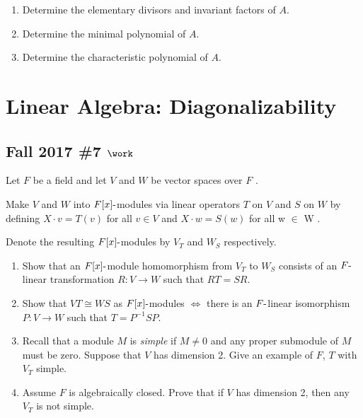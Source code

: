 \begin{enumerate}
\def\labelenumi{\alph{enumi}.}
\item
  Determine the elementary divisors and invariant factors of \(A\).
\item
  Determine the minimal polynomial of \(A\).
\item
  Determine the characteristic polynomial of \(A\).
\end{enumerate}

\hypertarget{linear-algebra-diagonalizability}{%
\section{Linear Algebra:
Diagonalizability}\label{linear-algebra-diagonalizability}}

\hypertarget{fall-2017-7-work}{%
\subsection{\texorpdfstring{Fall 2017 \#7
\(\work\)}{Fall 2017 \#7 \textbackslash work}}\label{fall-2017-7-work}}

Let \(F\) be a field and let \(V\) and \(W\) be vector spaces over \(F\)
.

Make \(V\) and \(W\) into \(F[x]{\hbox{-}}\)modules via linear operators
\(T\) on \(V\) and \(S\) on \(W\) by defining \(X \cdot v = T (v)\) for
all \(v \in V\) and \(X \cdot w = S(w)\) for all w \(\in\) W .

Denote the resulting \(F[x]{\hbox{-}}\)modules by \(V_T\) and \(W_S\)
respectively.

\begin{enumerate}
\def\labelenumi{\alph{enumi}.}
\item
  Show that an \(F[x]{\hbox{-}}\)module homomorphism from \(V_T\) to
  \(W_S\) consists of an \(F{\hbox{-}}\)linear transformation
  \(R : V \to W\) such that \(RT = SR\).
\item
  Show that \(VT \cong WS\) as \(F[x]{\hbox{-}}\)modules \(\iff\) there
  is an \(F{\hbox{-}}\)linear isomorphism \(P : V \to W\) such that
  \(T = P^{-1}SP\).
\item
  Recall that a module \(M\) is \emph{simple} if \(M \neq 0\) and any
  proper submodule of \(M\) must be zero. Suppose that \(V\) has
  dimension 2. Give an example of \(F\), \(T\) with \(V_T\) simple.
\item
  Assume \(F\) is algebraically closed. Prove that if \(V\) has
  dimension 2, then any \(V_T\) is not simple.
\end{enumerate}

